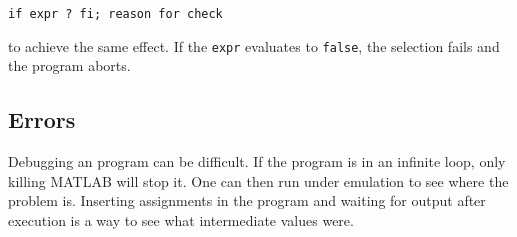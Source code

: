 {\tt if expr ? fi;\quad\quad     \bq\ reason for check} 

\noindent to achieve the same effect.  
If the {\tt expr} evaluates to {\tt false}, the selection fails and
the  program aborts.

\subsection{Errors}

Debugging an  program can be difficult. 
If the  program is in an infinite loop, 
only killing MATLAB will stop it.
One can then run under emulation to see where the problem is.
Inserting assignments in the  program 
and waiting for output after execution is a way to see
what intermediate values were.




